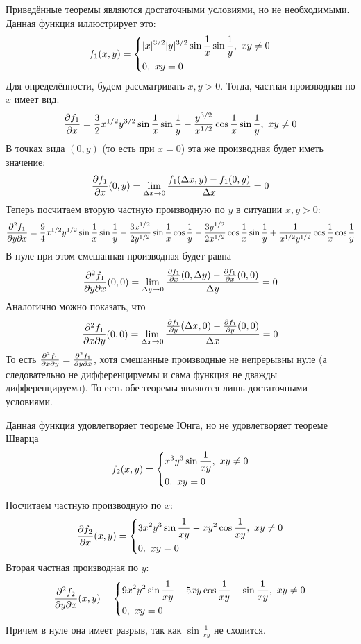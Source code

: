 \begin{example}
	Приведённые теоремы являются достаточными условиями, но не необходимыми. Данная функция иллюстрирует это:
	\[
		f_1(x, y) = \left\{\begin{aligned}
			&{|x|^{3/2} |y|^{3/2} \sin \frac{1}{x} \sin \frac{1}{y},\ xy \neq 0}
			\\
			&{0,\ xy = 0}
		\end{aligned}\right.
	\]
	Для определённости, будем рассматривать $x, y > 0$. Тогда, частная производная по $x$ имеет вид:
	\[
		\frac{\partial f_1}{\partial x} = \frac{3}{2} x^{1/2} y^{3/2} \sin \frac{1}{x} \sin \frac{1}{y} - \frac{y^{3/2}}{x^{1/2}} \cos \frac{1}{x} \sin \frac{1}{y},\ xy \neq 0
	\]
	В точках вида $(0, y)$ (то есть при $x = 0$) эта же производная будет иметь значение:
	\[
		\frac{\partial f_1}{\partial x} (0, y) = \lim\limits_{\Delta x \to 0} \frac{f_1(\Delta x, y) - f_1(0, y)}{\Delta x} = 0
	\]
	Теперь посчитаем вторую частную производную по $y$ в ситуации $x, y > 0$:
	\[
		\frac{\partial^2 f_1}{\partial y \partial x} = \frac{9}{4} x^{1/2} y^{1/2} \sin \frac{1}{x} \sin \frac{1}{y} - \frac{3x^{1/2}}{2y^{1/2}} \sin \frac{1}{x} \cos \frac{1}{y} - \frac{3y^{1/2}}{2x^{1/2}} \cos \frac{1}{x} \sin \frac{1}{y} + \frac{1}{x^{1/2} y^{1/2}} \cos \frac{1}{x} \cos \frac{1}{y} 
	\]
	В нуле при этом смешанная производная будет равна
	\[
		\frac{\partial^2 f_1}{\partial y \partial x}(0, 0) = \lim\limits_{\Delta y \to 0}\frac{\frac{\partial f_1}{\partial x}(0, \Delta y) - \frac{\partial f_1}{\partial x}(0, 0)}{\Delta y} = 0
	\]
	Аналогично можно показать, что 
	\[
		\frac{\partial^2 f_1}{\partial x \partial y}(0, 0) = \lim\limits_{\Delta x \to 0}\frac{\frac{\partial f_1}{\partial y}(\Delta x, 0) - \frac{\partial f_1}{\partial y}(0, 0)}{\Delta x} = 0
	\]
	То есть $\frac{\partial^2 f_1}{\partial x \partial y} = \frac{\partial^2 f_1}{\partial y \partial x}$, хотя смешанные производные не непрерывны нуле (а следовательно не дифференцируемы и сама функция не дважды дифференцируема). То есть обе теоремы являются лишь достаточными условиями.
\end{example}

\begin{example}
	Данная функция удовлетворяет теореме Юнга, но не удовлетворяет теореме Шварца
	\[
		f_2(x, y) = \left\{\begin{aligned}
			&{x^3 y^3 \sin \frac{1}{xy},\ xy \neq 0}
			\\
			&{0,\ xy = 0}
		\end{aligned}\right.
	\]
	
	Посчитаем частную производную по $x$:
	\[
		\pd{f_2}{x}(x, y) = \System{
			&{3x^2y^3 \sin \frac{1}{xy} - xy^2 \cos \frac{1}{xy},\ xy \neq 0}
			\\
			&{0,\ xy = 0}
		}
	\]
	Вторая частная производная по $y$:
	\[
		\frac{\partial^2 f_2}{\partial y \partial x}(x, y) = \left\{\begin{aligned}
			&{9x^2y^2 \sin \frac{1}{xy} - 5xy\cos\frac{1}{xy} - \sin\frac{1}{xy},\ xy \neq 0}
			\\
			&{0,\ xy = 0}
		\end{aligned}\right.
	\]
	Причем в нуле она имеет разрыв, так как $\sin\frac{1}{xy}$ не сходится.
\end{example}

